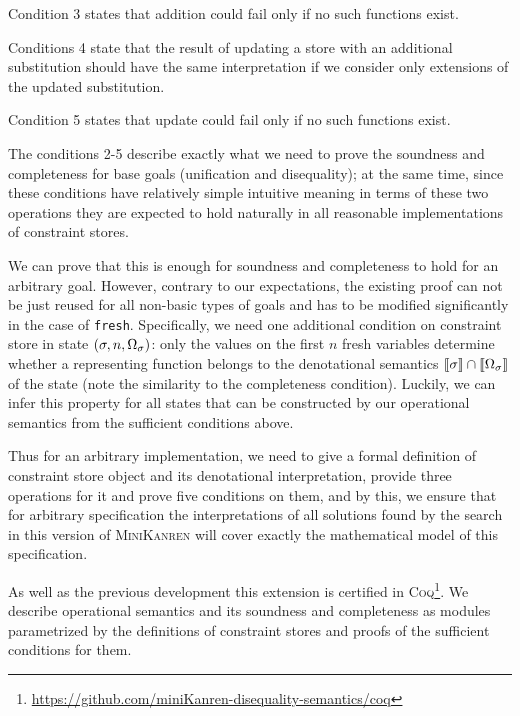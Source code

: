 Condition 3 states that addition could fail only if no such functions exist.

Conditions 4 state that the result of updating a store with an additional substitution should have the same interpretation if we consider only extensions of the updated substitution.

Condition 5 states that update could fail only if no such functions exist.

The conditions 2-5 describe exactly what we need to prove the soundness and completeness for base goals (unification and disequality); at the same time,
since these conditions have relatively simple intuitive meaning in terms of these two operations they are expected to hold naturally
in all reasonable implementations of constraint stores.

We can prove that this is enough for soundness and completeness to hold for an arbitrary goal. However,
contrary to our expectations, the existing proof can not be just reused for all non-basic types of goals and has to be modified
significantly in the case of \lstinline|fresh|. Specifically, we need one additional condition on constraint store in state $(\sigma, n, \Omega_\sigma)$:
only the values on the first $n$ fresh variables determine whether a representing function belongs to the denotational semantics $\llbracket{\sigma}\rrbracket \cap \llbracket{\Omega_\sigma}\rrbracket$
of the state (note the similarity to the completeness condition). Luckily, we can infer this property for all states that can be constructed by our operational
semantics from the sufficient conditions above.

Thus for an arbitrary implementation, we need to give a formal definition of constraint store object and its denotational interpretation, provide three
operations for it and prove five conditions on them, and by this, we ensure that for arbitrary specification the interpretations of all solutions found by the
search in this version of \textsc{MiniKanren} will cover exactly the mathematical model of this specification.

As well as the previous development this extension is certified in \textsc{Coq}\footnote{\url{https://github.com/miniKanren-disequality-semantics/coq}}.
We describe operational semantics and its soundness and completeness as modules parametrized by the definitions of constraint
stores and proofs of the sufficient conditions for them.
